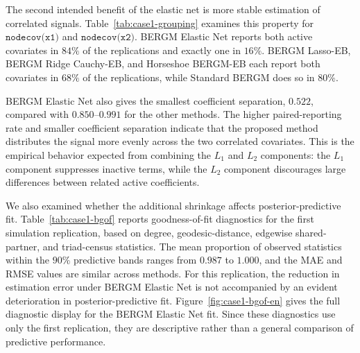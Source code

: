 \documentclass[preprint,12pt,authoryear]{elsarticle}
\begin{document}
The second intended benefit of the elastic net is more stable estimation of
correlated signals. Table~\ref{tab:case1-grouping} examines this property for \(\texttt{nodecov(x1)}\) and \(\texttt{nodecov(x2)}\). BERGM Elastic Net
reports both active covariates in \(84\%\) of the replications and exactly one
in \(16\%\). BERGM Lasso-EB, BERGM Ridge Cauchy-EB, and Horseshoe BERGM-EB
each report both covariates in \(68\%\) of the replications, while Standard
BERGM does so in \(80\%\).

BERGM Elastic Net also gives the smallest coefficient separation,
\(0.522\), compared with \(0.850\)--\(0.991\) for the other methods. The higher paired-reporting rate and smaller coefficient separation indicate that the proposed method distributes the signal more evenly across the two correlated
covariates. This is the empirical behavior expected from combining the \(L_1\) and \(L_2\) components: the \(L_1\) component suppresses inactive
terms, while the \(L_2\) component discourages large differences between
related active coefficients.

\begin{table}[H]
\centering
\caption{Paired reporting and coefficient separation for the correlated active
covariates \(\texttt{nodecov(x1)}\) and \(\texttt{nodecov(x2)}\).
Coefficient separation is the absolute difference between their 
means. Entries are averages across \(50\) replications, with Monte Carlo
standard errors in parentheses.}
\label{tab:case1-grouping}
\end{table}

We also examined whether the additional shrinkage affects
posterior-predictive fit. Table~\ref{tab:case1-bgof} reports goodness-of-fit
diagnostics for the first simulation replication, based on degree,
geodesic-distance, edgewise shared-partner, and triad-census statistics. The
mean proportion of observed statistics within the \(90\%\) predictive bands
ranges from \(0.987\) to \(1.000\), and the MAE and RMSE values are similar
across methods. For this replication, the reduction in estimation error under
BERGM Elastic Net is not accompanied by an evident deterioration in
posterior-predictive fit. Figure~\ref{fig:case1-bgof-en} gives the full
diagnostic display for the BERGM Elastic Net fit. Since these diagnostics use
only the first replication, they are descriptive rather than a general
comparison of predictive performance.
\end{document}
